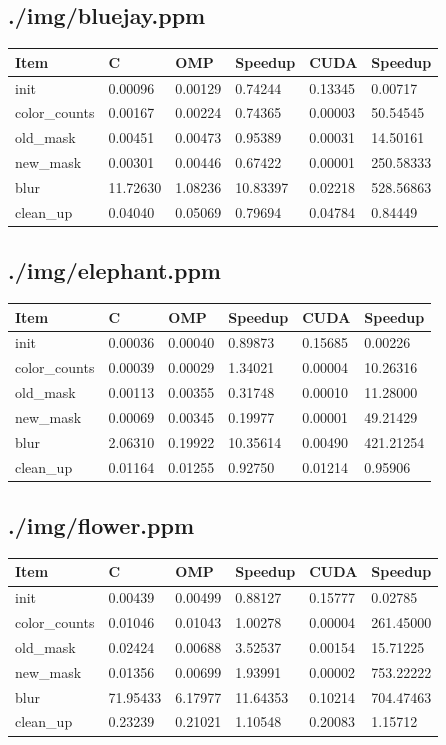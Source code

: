 \documentclass[12pt]{article}
\begin{document}
\subsection{./img/bluejay.ppm}
\begin{tabular}{l|l|l|l|l|l}
    Item & C & OMP & Speedup & CUDA & Speedup
\\  \hline
    init & 0.00096 & 0.00129 & 0.74244 & 0.13345 & 0.00717
\\  color_counts & 0.00167 & 0.00224 & 0.74365 & 0.00003 & 50.54545
\\  old_mask & 0.00451 & 0.00473 & 0.95389 & 0.00031 & 14.50161
\\  new_mask & 0.00301 & 0.00446 & 0.67422 & 0.00001 & 250.58333
\\  blur & 11.72630 & 1.08236 & 10.83397 & 0.02218 & 528.56863
\\  clean_up & 0.04040 & 0.05069 & 0.79694 & 0.04784 & 0.84449
\end{tabular}
\subsection{./img/elephant.ppm}
\begin{tabular}{l|l|l|l|l|l}
    Item & C & OMP & Speedup & CUDA & Speedup
\\  \hline
    init & 0.00036 & 0.00040 & 0.89873 & 0.15685 & 0.00226
\\  color_counts & 0.00039 & 0.00029 & 1.34021 & 0.00004 & 10.26316
\\  old_mask & 0.00113 & 0.00355 & 0.31748 & 0.00010 & 11.28000
\\  new_mask & 0.00069 & 0.00345 & 0.19977 & 0.00001 & 49.21429
\\  blur & 2.06310 & 0.19922 & 10.35614 & 0.00490 & 421.21254
\\  clean_up & 0.01164 & 0.01255 & 0.92750 & 0.01214 & 0.95906
\end{tabular}
\subsection{./img/flower.ppm}
\begin{tabular}{l|l|l|l|l|l}
    Item & C & OMP & Speedup & CUDA & Speedup
\\  \hline
    init & 0.00439 & 0.00499 & 0.88127 & 0.15777 & 0.02785
\\  color_counts & 0.01046 & 0.01043 & 1.00278 & 0.00004 & 261.45000
\\  old_mask & 0.02424 & 0.00688 & 3.52537 & 0.00154 & 15.71225
\\  new_mask & 0.01356 & 0.00699 & 1.93991 & 0.00002 & 753.22222
\\  blur & 71.95433 & 6.17977 & 11.64353 & 0.10214 & 704.47463
\\  clean_up & 0.23239 & 0.21021 & 1.10548 & 0.20083 & 1.15712
\end{tabular}
\end{document}

